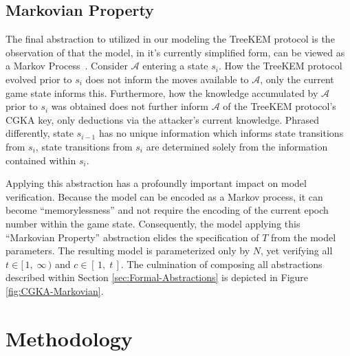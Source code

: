 \documentclass[runningheads]{llncs}
\newcommand{\Adversary}{\ensuremath{\mathcal{A}}\xspace}
\newcommand{\NumericRange}[2]{\ensuremath{\left[\,#1,\; #2\,\right]}\xspace}
\newcommand{\NumericRangeOpenR}[2]{\ensuremath{[\,#1,\; #2\,)}\xspace}
\begin{document}
\subsection{Markovian Property}

The final abstraction to utilized in our modeling the TreeKEM protocol is the observation of that the model, in it's currently simplified form, can be viewed as a Markov Process~\cite{markov1906a}.
Consider \Adversary entering a \CGKAsec state $s_{i}$.
How the TreeKEM protocol evolved prior to $s_{i}$ does not inform the moves available to \Adversary, only the current game state informs this.
Furthermore, how the knowledge accumulated by \Adversary prior to $s_{i}$ was obtained does not further inform \Adversary of the TreeKEM protocol's CGKA key, only deductions via the attacker's current knowledge.
Phrased differently, state $s_{i-1}$ has no unique information which informs state transitions from $s_{i}$, state transitions from $s_{i}$ are determined solely from the information contained within $s_{i}$.

Applying this abstraction has a profoundly important impact on model verification.
Because the model can be encoded as a Markov process, it can become ``memorylessness'' and not require the encoding of the current epoch number within the game state.
Consequently, the model applying this ``Markovian Property'' abstraction elides the specification of $T$ from the model parameters.
The resulting model is parameterized only by $N$, yet verifying all $t \in \NumericRangeOpenR{1}{\infty}$ and $c \in \NumericRange{1}{t}$.
The culmination of composing all abstractions described within Section \ref{sec:Formal-Abstractions} is depicted in Figure \ref{fig:CGKA-Markovian}.



\section{Methodology}

\subsection{\Promela}
\end{document}
